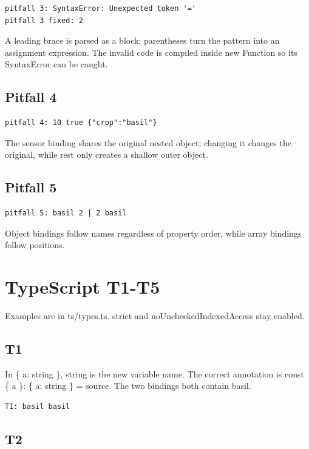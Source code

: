 \documentclass[
  10pt,
  a4paper,
]{article}
\begin{document}
\begin{lstlisting}
pitfall 3: SyntaxError: Unexpected token '='
pitfall 3 fixed: 2
\end{lstlisting}

A leading brace is parsed as a block; parentheses turn the pattern into
an assignment expression. The invalid code is compiled inside new
Function so its SyntaxError can be caught.

\subsection{Pitfall 4}\label{pitfall-4}

\begin{lstlisting}
pitfall 4: 10 true {"crop":"basil"}
\end{lstlisting}

The sensor binding shares the original nested object; changing it
changes the original, while rest only creates a shallow outer object.

\subsection{Pitfall 5}\label{pitfall-5}

\begin{lstlisting}
pitfall 5: basil 2 | 2 basil
\end{lstlisting}

Object bindings follow names regardless of property order, while array
bindings follow positions.

\section{TypeScript T1-T5}\label{typescript-t1-t5}

Examples are in ts/types.ts. strict and noUncheckedIndexedAccess stay
enabled.

\subsection{T1}\label{t1}

In \{ a: string \}, string is the new variable name. The correct
annotation is const \{ a \}: \{ a: string \} = source. The two bindings
both contain basil.

\begin{lstlisting}
T1: basil basil
\end{lstlisting}

\subsection{T2}\label{t2}
\end{document}
